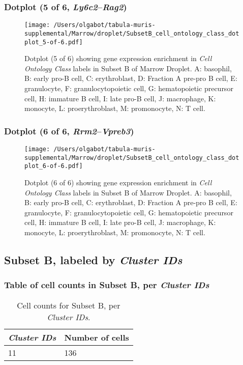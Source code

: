 \clearpage

\subsubsection{Dotplot (5 of 6, \emph{Ly6c2}--\emph{Rag2})}
\begin{figure}[h]
\centering
\texttt{[image: /Users/olgabot/tabula-muris-supplemental/Marrow/droplet/SubsetB\_cell\_ontology\_class\_dotplot\_5-of-6.pdf]}

\caption{ Dotplot (5 of 6)  showing gene expression enrichment in \emph{Cell Ontology Class} labels in Subset B of Marrow Droplet. A: basophil, B: early pro-B cell, C: erythroblast, D: Fraction A pre-pro B cell, E: granulocyte, F: granulocytopoietic cell, G: hematopoietic precursor cell, H: immature B cell, I: late pro-B cell, J: macrophage, K: monocyte, L: proerythroblast, M: promonocyte, N: T cell.}
\end{figure}


\clearpage

\subsubsection{Dotplot (6 of 6, \emph{Rrm2}--\emph{Vpreb3})}
\begin{figure}[h]
\centering
\texttt{[image: /Users/olgabot/tabula-muris-supplemental/Marrow/droplet/SubsetB\_cell\_ontology\_class\_dotplot\_6-of-6.pdf]}

\caption{ Dotplot (6 of 6)  showing gene expression enrichment in \emph{Cell Ontology Class} labels in Subset B of Marrow Droplet. A: basophil, B: early pro-B cell, C: erythroblast, D: Fraction A pre-pro B cell, E: granulocyte, F: granulocytopoietic cell, G: hematopoietic precursor cell, H: immature B cell, I: late pro-B cell, J: macrophage, K: monocyte, L: proerythroblast, M: promonocyte, N: T cell.}
\end{figure}


\clearpage

\subsection{Subset B, labeled by \emph{Cluster IDs}}
\subsubsection{Table of cell counts in Subset B, per \emph{Cluster IDs}}\begin{table}[h]
\centering
\label{my-label}
\begin{tabular}{@{}ll@{}}
\toprule

\emph{Cluster IDs}& Number of cells \\ \midrule
11 & 136 \\
\bottomrule
\end{tabular}
\caption{Cell counts for Subset B, per \emph{Cluster IDs}.}
\end{table}


